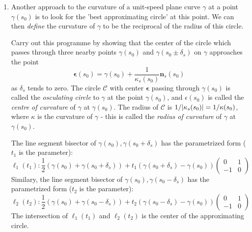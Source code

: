 \documentclass{article}
\DeclarePairedDelimiter\abs{\lvert}{\rvert}
\DeclarePairedDelimiter\norm{\lVert}{\rVert}
\DeclareMathOperator\sgn{sgn}
\begin{document}
\begin{enumerate}
\begin{proof}
$$$$
Similarly we can show that $T=\frac{\gamma'(t)}{\norm{\gamma'(t)}}\Rightarrow \tilde{\bm{n}}_s=\sgn\{1-\lambda \kappa_s\}\bm{n}_s$
$$
\diff{\tilde{T}}{\tilde{s}}=\frac{\diff{\tilde{T}}{t}}{\abs{1-\lambda \kappa_s}\diff{s}{t}}
$$
Since $\kappa_s(t)$ is continuous and $\lambda \kappa_s(t)\neq 1$ , $1-\lambda \kappa_s(t)$ has constant sign. therefore 
$\diff{\tilde{T}}{t} =\sgn\{1-\lambda\kappa_s\} \diff{T}{t} \Rightarrow \diff{\tilde{T}}{s} =\frac{\sgn\{1-\lambda\kappa_s\}}{\abs{1-\lambda\kappa_s}}\diff{T}{s}$
Let $\kappa_s$ be the signed curvature of $\gamma$ and $\tilde{\kappa}_s$ be the signed curvature of $\gamma^{\lambda}$.
Then
$$
\tilde{\kappa}_s = \diff{\tilde{T}}{s}\cdot \tilde{\bm{n}}_s =\frac{\sgn^2\{1-\lambda\kappa_s\}}{\abs{1-\lambda\kappa_s}}\diff{T}{s} \cdot \bm{n}_s
= \frac{1}{\abs{1-\lambda\kappa_s}}\kappa_s
$$

\end{proof}
\item Another approach to the curvature of a unit-speed plane curve $\gamma$ at a point $\gamma(s_0)$ is to look for the 
'best approximating circle' at this point. We can then \textit{define} the curvature of $\gamma$ to be the reciprocal of the radius of this circle.

Carry out this programme by showing that the center of the circle which passes through three nearby points $\gamma(s_0)$ and $\gamma(s_0\pm \delta_s)$ on $
\gamma$ approaches the point
\begin{equation}\label{eq:center_of_circle}
\bm{\epsilon}(s_0) = \gamma(s_0) + \frac{1}{\kappa_s(s_0)}\bm{n}_s(s_0)
\end{equation}
as $\delta_s$ tends to zero. The circle $\mathcal{C}$ with center $\bm{\epsilon}$ passing through $\gamma(s_0)$ is called the \textit{osculating circle} to $\gamma$ at the point $\gamma(s_0)$, and $\epsilon(s_0)$ is called the \textit{centre of curvature} of $\gamma$ at $\gamma(s_0)$. The radius of $\mathcal{C}$
is $1/\abs{\kappa_s(s_0)}=1/\kappa(s_0)$, where $\kappa$ is the curvature of $\gamma$ - this is called the \textit{radius of curvature} of $\gamma$ at $\gamma(s_0)$.
\begin{solution}
The line segment bisector of $\gamma(s_0),\gamma(s_0+\delta_s)$ has the parametrized form ($t_1$ is the parameter): 
$$
\ell_1(t_1): \frac{1}{2}(\gamma(s_0)+\gamma(s_0+\delta_s)) + t_1 (\gamma(s_0+\delta_s)-\gamma(s_0))\begin{pmatrix}0 & 1 \\ -1 & 0\end{pmatrix}
$$
Similary, the line segment bisector of $\gamma(s_0),\gamma(s_0-\delta_s)$ has the parametrized form ($t_2$ is the parameter): 
$$
\ell_2(t_2): \frac{1}{2}(\gamma(s_0)+\gamma(s_0-\delta_s)) + t_2 (\gamma(s_0-\delta_s)-\gamma(s_0))\begin{pmatrix}0 & 1 \\ -1 & 0\end{pmatrix} 
$$
The intersection of $\ell_1(t_1)$ and $\ell_2(t_2)$ is the center of the approximating circle.


\end{solution}
\end{enumerate}
\end{document}
